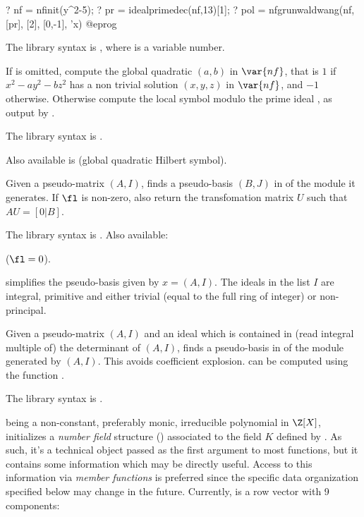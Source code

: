 \bprog
? nf = nfinit(y^2-5);
? pr = idealprimedec(nf,13)[1];
? pol = nfgrunwaldwang(nf, [pr], [2], [0,-1], 'x)
@eprog

The library syntax is , where  is a variable number.

\label{se:nfhilbert}
If  is omitted,
compute the global quadratic  $(a,b)$ in $\var{nf}$, that
is $1$ if $x^2 - a y^2 - b z^2$ has a non trivial solution $(x,y,z)$ in
$\var{nf}$, and $-1$ otherwise. Otherwise compute the local symbol modulo
the prime ideal , as output by .

The library syntax is .

Also available is  (global
quadratic Hilbert symbol).

\label{se:nfhnf}
Given a pseudo-matrix $(A,I)$, finds a
pseudo-basis $(B,J)$ in  of the module it generates.
If $\fl$ is non-zero, also return the transfomation matrix $U$ such that
$AU = [0|B]$.

The library syntax is .
Also available:

 ($\fl = 0$).

 simplifies the pseudo-basis
given by $x = (A,I)$. The ideals in the list $I$ are integral, primitive and
either trivial (equal to the full ring of integer) or non-principal.

\label{se:nfhnfmod}
Given a pseudo-matrix $(A,I)$
and an ideal  which is contained in (read integral multiple of) the
determinant of $(A,I)$, finds a pseudo-basis in 
of the module generated by $(A,I)$. This avoids coefficient explosion.
 can be computed using the function .

The library syntax is .

\label{se:nfinit}
 being a non-constant,
preferably monic, irreducible polynomial in $\Z[X]$, initializes a
\emph{number field} structure () associated to the field $K$ defined
by . As such, it's a technical object passed as the first argument
to most  functions, but it contains some information which
may be directly useful. Access to this information via \emph{member
functions} is preferred since the specific data organization specified below
may change in the future. Currently,  is a row vector with 9
components:

